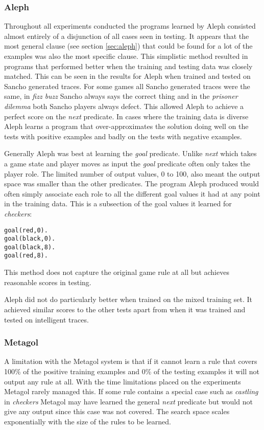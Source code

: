 \subsubsection{Aleph}
Throughout all experiments conducted the programs learned by Aleph consisted almost entirely of a disjunction of all cases seen in testing. It appears that the most general clause (see section \ref{sec:aleph}) that could be found for a lot of the examples was also the most specific clause. This simplistic method resulted in programs that performed better when the training and testing data was closely matched. This can be seen in the results for Aleph when trained and tested on Sancho generated traces. For some games all Sancho generated traces were the same, in \textit{fizz buzz} Sancho always says the correct thing and in the \textit{prisoner dilemma} both Sancho players always defect. This allowed Aleph to achieve a perfect score on the \textit{next} predicate. In cases where the training data is diverse Aleph learns a program that over-approximates the solution doing well on the tests with positive examples and badly on the tests with negative examples.

Generally Aleph was best at learning the \textit{goal} predicate. Unlike \textit{next} which takes a game state and player moves as input the \textit{goal} predicate often only takes the player role. The limited number of output values, 0 to 100, also meant the output space was smaller than the other predicates. The program Aleph produced would often simply associate each role to all the different goal values it had at any point in the training data. This is a subsection of the goal values it learned for \textit{checkers}:
\begin{verbatim}
goal(red,0).
goal(black,0).
goal(black,8).
goal(red,8).
\end{verbatim}
This method does not capture the original game rule at all but achieves reasonable scores in testing.

Aleph did not do particularly better when trained on the mixed training set. It achieved similar scores to the other tests apart from when it was trained and tested on intelligent traces.

\subsubsection{Metagol}
A limitation with the Metagol system is that if it cannot learn a rule that covers 100\% of the positive training examples and 0\% of the testing examples it will not output any rule at all. With the time limitations placed on the experiments Metagol rarely managed this. If some rule contains a special case such as \textit{castling} in \textit{checkers} Metagol may have learned the general \textit{next} predicate but would not give any output since this case was not covered. The search space scales exponentially with the size of the rules to be learned.

